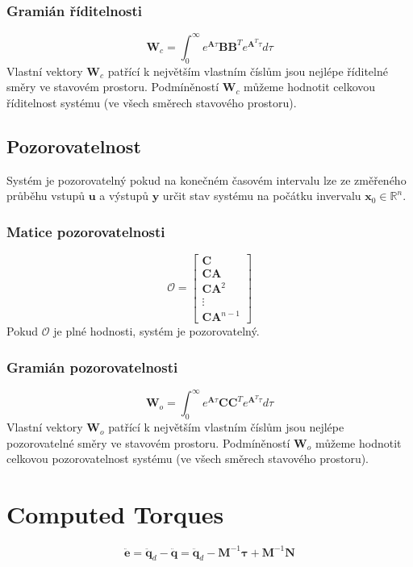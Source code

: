 \documentclass{article}
\begin{document}
	\subsubsection*{Gramián říditelnosti}
	\begin{equation}
		\bm{W}_{c}
		=
		\int_{0}^{\infty} e^{\bm{A} \tau} \bm{B} \bm{B}^T e^{\bm{A}^T \tau} d \tau
	\end{equation}
	Vlastní vektory $\bm{W}_c$ patřící k největším vlastním číslům jsou nejlépe říditelné směry ve stavovém prostoru. Podmíněností $\bm{W}_c$ můžeme hodnotit celkovou říditelnost systému (ve všech směrech stavového prostoru).

	\subsection*{Pozorovatelnost}
	Systém je pozorovatelný pokud na konečném časovém intervalu lze ze změřeného průběhu vstupů $\bm{u}$ a výstupů $\bm{y}$ určit stav systému na počátku invervalu $\bm{x}_0 \in \mathbb{R}^n$.
	
	\subsubsection*{Matice pozorovatelnosti}
	\begin{equation}
		\bm{\mathcal{O}}
		=
		\begin{bmatrix}
			\bm{C} \\
			\bm{C} \bm{A} \\
			\bm{C} \bm{A}^{2} \\
			\vdots \\
			\bm{C} \bm{A}^{n-1}
		\end{bmatrix}
	\end{equation}
	Pokud $\bm{\mathcal{O}}$ je plné hodnosti, systém je pozorovatelný.

	\subsubsection*{Gramián pozorovatelnosti}
	\begin{equation}
		\bm{W}_{o}
		=
		\int_{0}^{\infty} e^{\bm{A} \tau} \bm{C} \bm{C}^T e^{\bm{A}^T \tau} d \tau
	\end{equation}
	Vlastní vektory $\bm{W}_o$ patřící k největším vlastním číslům jsou nejlépe pozorovatelné směry ve stavovém prostoru. Podmíněností $\bm{W}_o$ můžeme hodnotit celkovou pozorovatelnost systému (ve všech směrech stavového prostoru).

	\section{Computed Torques}
	\begin{equation}
		\bm{\ddot{e}}
		=
		\bm{\ddot{q}}_{d}-\bm{\ddot{q}}
		=
		\bm{\ddot{q}}_{d}-\bm{M}^{-1} \bm{\tau}+\bm{M}^{-1} \bm{N}
	\end{equation}
\end{document}
